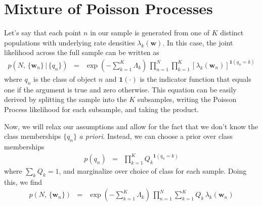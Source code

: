 \documentclass[12pt,preprint]{aastex}
\newcommand{\foreign}[1]{\emph{#1}}
\newcommand{\figlabel}[1]{\label{fig:#1}}
\newcommand{\bvec}[1]{\ensuremath{\boldsymbol{#1}}}
\newcommand{\rate}{\ensuremath{\lambda}}
\newcommand{\intrate}{\ensuremath{\Lambda}}
\begin{document}
\section{Mixture of Poisson Processes}

Let's say that each point $n$ in our sample is generated from one of $K$
distinct populations with underlying rate densities $\rate_k(\bvec{w})$.
In this case, the joint likelihood across the full sample can be written as
\begin{eqnarray}
p(N,\,\{\bvec{w}_n\}\,|\,\{q_n\}) &=&
    \exp\left(-\sum_{k=1}^K\intrate_k\right) \,
    \prod_{n=1}^N\prod_{k=1}^K
        \left[\rate_k(\bvec{w}_n)\right]^{\bvec{1}(q_n = k)}
\end{eqnarray}
where $q_n$ is the class of object $n$ and $\bvec{1}(\cdot)$ is the indicator
function that equals one if the argument is true and zero otherwise.
This equation can be easily derived by splitting the sample into the $K$
subsamples, writing the Poisson Process likelihood for each subsample, and
taking the product.

Now, we will relax our assumptions and allow for the fact that we don't know
the class memberships $\{q_n\}$ \foreign{a priori}.
Instead, we can choose a prior over class memberships
\begin{eqnarray}
p(q_n) &=& \prod_{k=1}^K {Q_k}^{\bvec{1}(q_n = k)}
\end{eqnarray}
where $\sum_k Q_k = 1$, and marginalize over choice of class for each sample.
Doing this, we find
\begin{eqnarray}
p(N,\,\{\bvec{w}_n\}) &=&
    \exp\left(-\sum_{k=1}^K\intrate_k\right) \,
    \prod_{n=1}^N\sum_{k=1}^K
        Q_k\,\rate_k(\bvec{w}_n)
\end{eqnarray}


\end{document}
